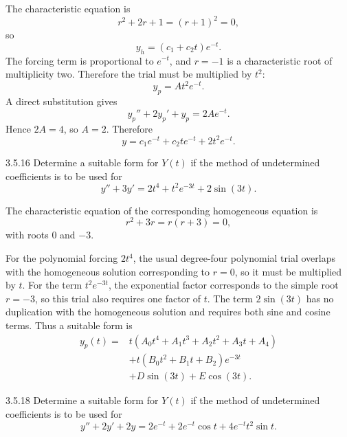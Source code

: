 \documentclass[11pt,oneside]{article}
\begin{document}
\begin{solution}
The characteristic equation is
\[
    r^2+2r+1=(r+1)^2=0,
\]
so
\[
    y_h=(c_1+c_2t)e^{-t}.
\]
The forcing term is proportional to $e^{-t}$, and $r=-1$ is a characteristic root of multiplicity two. Therefore the trial must be multiplied by $t^2$:
\[
    y_p=At^2e^{-t}.
\]
A direct substitution gives
\[
    y_p''+2y_p'+y_p=2Ae^{-t}.
\]
Hence $2A=4$, so $A=2$. Therefore
\[
    \boxed{
        y=c_1e^{-t}+c_2te^{-t}+2t^2e^{-t}
    }.
\]
\end{solution}

\begin{problem}{3.5.16}
Determine a suitable form for $Y(t)$ if the method of undetermined coefficients is to be used for
\[
    y''+3y'=2t^4+t^2e^{-3t}+2\sin(3t).
\]
\end{problem}

\begin{solution}
The characteristic equation of the corresponding homogeneous equation is
\[
    r^2+3r=r(r+3)=0,
\]
with roots $0$ and $-3$.

For the polynomial forcing $2t^4$, the usual degree-four polynomial trial overlaps with the homogeneous solution corresponding to $r=0$, so it must be multiplied by $t$. For the term $t^2e^{-3t}$, the exponential factor corresponds to the simple root $r=-3$, so this trial also requires one factor of $t$. The term $2\sin(3t)$ has no duplication with the homogeneous solution and requires both sine and cosine terms. Thus a suitable form is
\[
    \boxed{
    \begin{aligned}
        y_p(t)={}&t(A_0t^4+A_1t^3+A_2t^2+A_3t+A_4)\\
        &+t(B_0t^2+B_1t+B_2)e^{-3t}\\
        &+D\sin(3t)+E\cos(3t).
    \end{aligned}}
\]
\end{solution}

\begin{problem}{3.5.18}
Determine a suitable form for $Y(t)$ if the method of undetermined coefficients is to be used for
\[
    y''+2y'+2y
    =2e^{-t}+2e^{-t}\cos t+4e^{-t}t^2\sin t.
\]
\end{problem}
\end{document}
